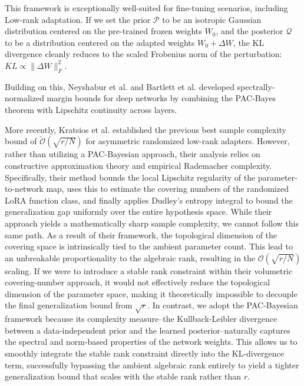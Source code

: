 \documentclass[a4paper,14pt]{extarticle}
\begin{document}
    This framework is exceptionally well-suited for fine-tuning scenarios, including Low-rank adaptation. If we set the prior $\mathcal{P}$ to be an isotropic Gaussian distribution centered on the pre-trained frozen weights $W_0$, and the posterior $\mathcal{Q}$ to be a distribution centered on the adapted weights $W_0 + \Delta W$, the KL divergence cleanly reduces to the scaled Frobenius norm of the perturbation: $KL \propto \|\Delta W\|_F^2$. 
    
    Building on this, Neyshabur et al. \cite{neyshabur2017pac} and Bartlett et al. \cite{bartlett2017spectrally} developed spectrally-normalized margin bounds for deep networks by combining the PAC-Bayes theorem with Lipschitz continuity across layers. 
    
    More recently, Kratsios et al. \cite{kratsios2025sharpgeneralizationboundsfoundation} established the previous best sample complexity bound of $\tilde{\mathcal{O}}(\sqrt{r/N})$ for asymmetric randomized low-rank adapters. However, rather than utilizing a PAC-Bayesian approach, their analysis relies on constructive approximation theory and empirical Rademacher complexity. Specifically, their method bounds the local Lipschitz regularity of the parameter-to-network map, uses this to estimate the covering numbers of the randomized LoRA function class, and finally applies Dudley's entropy integral to bound the generalization gap uniformly over the entire hypothesis space. While their approach yields a mathematically sharp sample complexity, we cannot follow this same path. As a result of their framework, the topological dimension of the covering space is intrinsically tied to the ambient parameter count. This lead to an unbreakable proportionality to the algebraic rank, resulting in the $\mathcal{O}(\sqrt{r/N})$ scaling. If we were to introduce a stable rank constraint within their volumetric covering-number approach, it would not effectively reduce the topological dimension of the parameter space, making it theoretically impossible to decouple the final generalization bound from $\sqrt{r}$. In contrast, we adopt the PAC-Bayesian framework because its complexity measure--the Kullback-Leibler divergence between a data-independent prior and the learned posterior--naturally captures the spectral and norm-based properties of the network weights. This allows us to smoothly integrate the stable rank constraint directly into the KL-divergence term, successfully bypassing the ambient algebraic rank entirely to yield a tighter generalization bound that scales with the stable rank rather than $r$.
\end{document}
